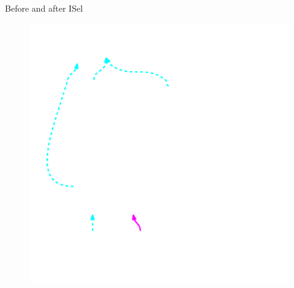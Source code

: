 
\begin{frame}{Before and after ISel}

\begin{minipage}[t]{0.50\linewidth}
    \begin{figure}
        \includegraphics[width = 1.00\textwidth]{examples/ex1b/ex1b-pre-isel.pdf}
    \end{figure}
\end{minipage}
\begin{minipage}[t]{0.49\linewidth}
    \begin{figure}

\end{figure}
\end{minipage}
\end{frame}
